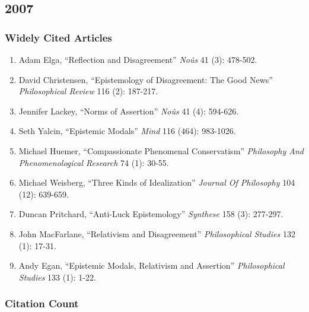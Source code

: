 \documentclass[
  10pt,
  letterpaper,
  DIV=11,
  numbers=noendperiod,
  twoside]{scrartcl}
\providecommand{\tightlist}{%
  \setlength{\itemsep}{0pt}\setlength{\parskip}{0pt}}\usepackage{longtable,booktabs,array}
\begin{document}
\newpage

\subsection{2007}\label{section-31}

\subsubsection*{Widely Cited Articles}\label{widely-cited-articles-31}

\begin{enumerate}
\def\labelenumi{\arabic{enumi}.}
\tightlist
\item
  Adam Elga, ``Reflection and Disagreement'' \emph{Noûs} 41 (3):
  478-502.
\item
  David Christensen, ``Epistemology of Disagreement: The Good News''
  \emph{Philosophical Review} 116 (2): 187-217.
\item
  Jennifer Lackey, ``Norms of Assertion'' \emph{Noûs} 41 (4): 594-626.
\item
  Seth Yalcin, ``Epistemic Modals'' \emph{Mind} 116 (464): 983-1026.
\item
  Michael Huemer, ``Compassionate Phenomenal Conservatism''
  \emph{Philosophy And Phenomenological Research} 74 (1): 30-55.
\item
  Michael Weisberg, ``Three Kinds of Idealization'' \emph{Journal Of
  Philosophy} 104 (12): 639-659.
\item
  Duncan Pritchard, ``Anti-Luck Epistemology'' \emph{Synthese} 158 (3):
  277-297.
\item
  John MacFarlane, ``Relativism and Disagreement'' \emph{Philosophical
  Studies} 132 (1): 17-31.
\item
  Andy Egan, ``Epistemic Modals, Relativism and Assertion''
  \emph{Philosophical Studies} 133 (1): 1-22.
\end{enumerate}

\subsubsection*{Citation Count}\label{citation-count-31}
\end{document}
